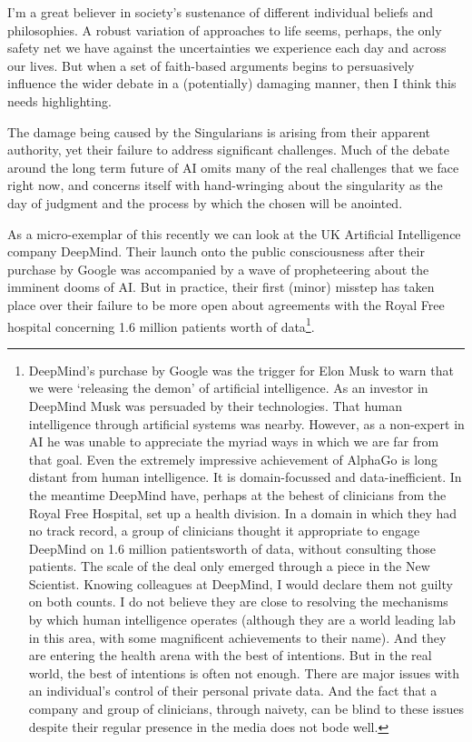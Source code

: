 \documentclass[a4paper]{caesar_book}
\begin{document}
I’m a great believer in society’s sustenance of different individual beliefs and philosophies. A robust variation of approaches to life seems, perhaps, the only safety net we have against the uncertainties we experience each day and across our lives. But when a set of faith-based arguments begins to persuasively influence the wider debate in a (potentially) damaging manner, then I think this needs highlighting.

The damage being caused by the Singularians is arising from their apparent authority, yet their failure to address significant challenges. Much of the debate around the long term future of AI omits many of the real challenges that we face right now, and concerns itself with hand-wringing about the singularity as the day of judgment and the process by which the chosen will be anointed.

As a micro-exemplar of this recently we can look at the UK Artificial Intelligence company DeepMind. Their launch onto the public consciousness after their purchase by Google was accompanied by a wave of propheteering about the imminent dooms of AI. But in practice, their first (minor) misstep has taken place over their failure to be more open about agreements with the Royal Free hospital concerning 1.6 million patients worth of data\footnote{DeepMind’s purchase by Google was the trigger for Elon Musk to warn that we were ‘releasing the demon’ of artificial intelligence. As an investor in DeepMind Musk was persuaded by their technologies. That human intelligence through artificial systems was nearby. However, as a non-expert in AI he was unable to appreciate the myriad ways in which we are far from that goal. Even the extremely impressive achievement of AlphaGo is long distant from human intelligence. It is domain-focussed and data-inefficient. In the meantime DeepMind have, perhaps at the behest of clinicians from the Royal Free Hospital, set up a health division. In a domain in which they had no track record, a group of clinicians thought it appropriate to engage DeepMind on 1.6 million patientsworth of data, without consulting those patients. The scale of the deal only emerged through a piece in the New Scientist. Knowing colleagues at DeepMind, I would declare them not guilty on both counts. I do not believe they are close to resolving the mechanisms by which human intelligence operates (although they are a world leading lab in this area, with some magnificent achievements to their name). And they are entering the health arena with the best of intentions. But in the real world, the best of intentions is often not enough. There are major issues with an individual’s control of their personal private data. And the fact that a company and group of clinicians, through naivety, can be blind to these issues despite their regular presence in the media does not bode well.}.
\end{document}
